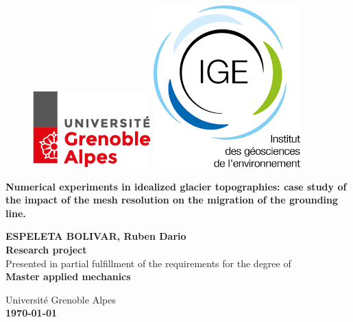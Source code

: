 \thispagestyle{empty}
\begin{center}
    	\begin{figure} [t]
		\includegraphics[width=0.2\linewidth]{../fig/logo_UGA.png}
		\hspace{8.0cm}
		\includegraphics[width=0.2\linewidth]{../fig/logo_IGE.png}
		\vspace{2.0cm}
	    \end{figure}

        \begin{Large}
        \textbf{Numerical experiments in idealized glacier topographies: case study of the impact of the mesh resolution on the migration of the grounding line.} 
        \end{Large}
        
        \vspace{0.8cm}
        \textbf{ESPELETA BOLIVAR, Ruben Dario}\\
        \vspace{3.0cm}
        \textbf{Research project}\\
	    Presented in partial fulfillment of the requirements for the degree of\\
	    \textbf{Master applied mechanics}\\
        \vspace{3.0cm}

        Université Grenoble Alpes\\
        \textbf{\today}
        \vspace{4.0cm}
\end{center}
\clearpage
